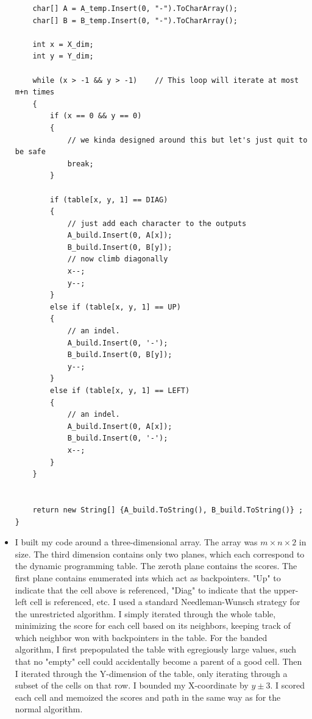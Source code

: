 \documentclass{article}
\begin{document}
\begin{itemize}
\begin{lstlisting}
    char[] A = A_temp.Insert(0, "-").ToCharArray();
    char[] B = B_temp.Insert(0, "-").ToCharArray();

    int x = X_dim;
    int y = Y_dim;

    while (x > -1 && y > -1)	// This loop will iterate at most m+n times
    {
        if (x == 0 && y == 0)
        {
            // we kinda designed around this but let's just quit to be safe
            break;
        }

        if (table[x, y, 1] == DIAG)
        {
            // just add each character to the outputs
            A_build.Insert(0, A[x]);
            B_build.Insert(0, B[y]);
            // now climb diagonally
            x--;
            y--;
        }
        else if (table[x, y, 1] == UP)
        {
            // an indel.  
            A_build.Insert(0, '-');
            B_build.Insert(0, B[y]);
            y--;
        }
        else if (table[x, y, 1] == LEFT)
        {
            // an indel.  
            A_build.Insert(0, A[x]);
            B_build.Insert(0, '-');
            x--;
        }
    }


    return new String[] {A_build.ToString(), B_build.ToString()} ;
}
\end{lstlisting}
    \item I built my code around a three-dimensional array.  The array was $m\times n\times 2$ in size.
    The third dimension contains only two planes, which each correspond to the dynamic programming table.
    The zeroth plane contains the scores.  The first plane contains enumerated ints which act as backpointers.  "Up" to indicate that the cell above is referenced, "Diag" to indicate that the upper-left 
    cell is referenced, etc.  I used a standard Needleman-Wunsch strategy for the unrestricted algorithm.
    I simply iterated through the whole table, minimizing the score for each cell based on its neighbors,
    keeping track of which neighbor won with backpointers in the table.  For the banded algorithm, I first
    prepopulated the table with egregiously large values, such that no "empty" cell could accidentally
    become a parent of a good cell.  Then I iterated through the Y-dimension of the table, only iterating 
    through a subset of the cells on that row.  I bounded my X-coordinate by $y\pm 3$.  I scored each cell
    and memoized the scores and path in the same way as for the normal algorithm.
    

\end{itemize}
\end{document}
